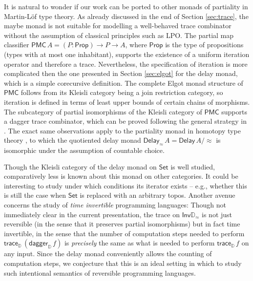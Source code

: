 \documentclass[runningheads,a4paper]{llncs}
\newcommand{\Set}{\mathsf{Set}}
\newcommand{\Inv}{\mathsf{Inv}}
\newcommand{\Delay}{\ensuremath{\mathsf{Delay}\,}}
\newcommand{\D}{\mathbb{D}}
\newcommand{\Dapprox}{\mathbb{D}_{\approx}}
\newcommand{\traceD}{\mathsf{trace}_\D}
\newcommand{\daggerD}{\mathsf{dagger}_\D}
\begin{document}
It is natural to wonder if our work can be ported to other monads of partiality
in Martin-L\"of type theory. As already discussed in the end of Section
\ref{sec:trace}, the maybe monad is not suitable for modelling a
well-behaved trace combinator without the assumption of classical principles
such as \textsf{LPO}. The partial map classifier \cite{UustaluV17-2,EscardoK17}
$\mathsf{PMC}\,A = (P : \mathsf{Prop}) \to P \to A$, where $\mathsf{Prop}$ is
the type of propositions (types with at most one inhabitant), supports the
existence of a uniform iteration operator and therefore a trace. Nevertheless,
the specification of iteration is more complicated then the one presented in
Section \ref{sec:elgot} for the delay monad, which is a simple corecursive
definition. The complete Elgot monad structure of $\mathsf{PMC}$ follows from its
Kleisli category being a join restriction category, so iteration is defined in
terms of least upper bounds of certain chains of morphisms. The subcategory of
partial isomorphisms of the Kleisli category of $\mathsf{PMC}$ supports a
dagger trace combinator, which can be proved following the general strategy in
\cite{KaarsgaardAG17}. The exact same observations apply to the partiality
monad in homotopy type theory \cite{AltenkirchDK17,ChapmanUV19}, to which the
quotiented delay monad $\mathsf{Delay}_{\approx}\,A = \Delay A/{\approx}$ is
isomorphic under the assumption of countable choice.

Though the Kleisli category of the delay monad on $\Set$ is well studied,
comparatively less is known about this monad on other categories. It could be
interesting to study under which conditions its iterator exists -- e.g., whether
this is still the case when $\Set$ is replaced with an arbitrary topos. Another
avenue concerns the study of \emph{time invertible} programming languages:
Though not immediately clear in the current presentation, the trace on
$\Inv\Dapprox$ is not just reversible (in the sense that it preserves partial
isomorphisms) but in fact time invertible, in the sense that the number of
computation steps needed to perform $\traceD \,(\daggerD\, f)$ is \emph{precisely}
the same as what is needed to perform $\traceD\,f$ on any input. Since the
delay monad conveniently allows the counting of computation steps, we
conjecture that this is an ideal setting in which to study such intentional
semantics of reversible programming languages.

%
%
%
%
%
%


\end{document}
